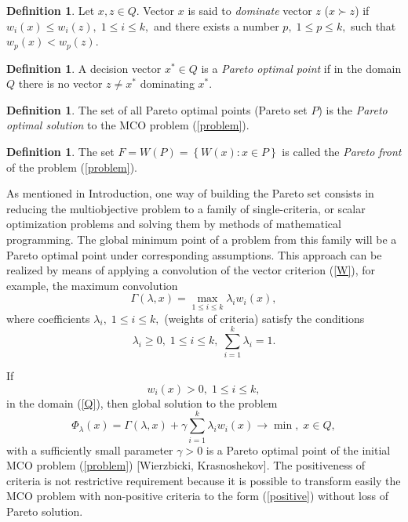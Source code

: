 \documentclass[]{interact}
\theoremstyle{plain}%
\theoremstyle{definition}
\newtheorem{definition}[theorem]{Definition}
\theoremstyle{remark}
\begin{document}
\begin{definition} 
Let $x,z \in Q$. Vector $x$ is said to \textit{dominate} vector $z$ ($x \succ z$) if $w_i(x) \leq w_i(z), \; 1 \leq i \leq k,$ and there exists a number $p, \; 1 \leq p \leq k,$  such that $w_p(x) < w_p(z)$.
\end{definition}
\begin{definition} 
A decision vector $x^* \in Q$ is a \textit{Pareto optimal point} if in the domain $Q$ there is no vector $z \neq x^*$ dominating $x^*$.
\end{definition}
\begin{definition} 
The set of all Pareto optimal points (Pareto set $P$) is the \textit{Pareto optimal solution} to the MCO problem (\ref{problem}).
\end{definition}
\begin{definition} 
The set $F=W(P)=\left\{W(x):x \in P\right\}$  is called the \textit{Pareto front} of the problem (\ref{problem}).
\end{definition}

As mentioned in Introduction, one way of building the Pareto set consists in reducing the multiobjective problem to a family of single-criteria, or scalar optimization problems and solving them by methods of mathematical programming.  The global minimum point of a problem from this family will be a Pareto optimal point under corresponding assumptions. This approach can be realized by means of applying a convolution of the vector criterion (\ref{W}), for example, the maximum convolution
\begin{equation}\label{conv}
\Gamma(\lambda,x) = \max_{1 \leq i \leq k}{\lambda_i w_i(x)},
\end{equation}
where coefficients $\lambda_i, \; 1 \leq i \leq k,$ (weights of criteria) satisfy the conditions
\begin{equation}\label{lambda}
\lambda_i \geq 0, \; 1 \leq i \leq k, \; \sum_{i=1}^k{\lambda_i} = 1.
\end{equation}

If
\begin{equation}\label{positive}
w_i(x) > 0, \; 1 \leq i \leq k,
\end{equation}
in the domain (\ref{Q}), then global solution to the problem
\begin{equation}\label{conv_problem}
\Phi_\lambda(x) = \Gamma(\lambda,x) + \gamma \sum_{i=1}^k{\lambda_i w_i(x)} \rightarrow \min, \; x \in Q,
\end{equation}
with a sufficiently small parameter $\gamma > 0$ is a Pareto optimal point of the initial MCO problem (\ref{problem}) \cite{Wierzbicki} [Wierzbicki, Krasnoshekov]. The positiveness of criteria is not restrictive requirement because it is possible to transform easily the MCO problem with non-positive criteria to the form (\ref{positive}) without loss of Pareto solution.
\end{document}
